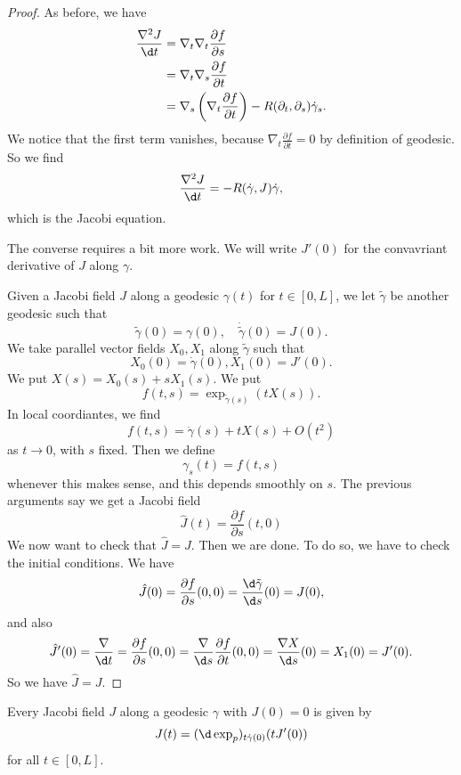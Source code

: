 \documentclass[a4paper]{article}
\begin{document}
\begin{proof}
  As before, we have
  \begin{align*}
    \frac{\nabla^2 J}{\d t} &= \nabla_t \nabla_t \frac{\partial f}{\partial s}\\
    &= \nabla_t \nabla_s \frac{\partial f}{\partial t}\\
    &= \nabla_s \left(\nabla_t \frac{\partial f}{\partial t}\right) - R(\partial_t, \partial_s) \dot{\gamma}_s.
  \end{align*}
  We notice that the first term vanishes, because $\nabla_t \frac{\partial f}{\partial t} = 0$ by definition of geodesic. So we find
  \[
    \frac{\nabla^2 J}{\d t} = -R(\dot{\gamma}, J) \dot{\gamma},
  \]
  which is the Jacobi equation.

  The converse requires a bit more work. We will write $J'(0)$ for the convavriant derivative of $J$ along $\gamma$.

  Given a Jacobi field $J$ along a geodesic $\gamma(t)$ for $t \in [0, L]$, we let $\tilde{\gamma}$ be another geodesic such that
  \[
    \tilde{\gamma}(0) = \gamma(0),\quad \dot{\tilde{\gamma}}(0) = J(0).
  \]
  We take parallel vector fields $X_0, X_1$ along $\tilde{\gamma}$ such that
  \[
    X_0(0) = \dot{\gamma}(0), X_1(0) = J'(0).
  \]
  We put $X(s) = X_0(s) + s X_1(s)$. We put
  \[
    f(t, s) = \exp_{\tilde{\gamma}(s)} (t X(s)).
  \]
  In local coordiantes, we find
  \[
    f(t, s) = \dot{\gamma}(s) + t X(s) + O(t^2)
  \]
  as $t \to 0$, with $s$ fixed. Then we define
  \[
    \gamma_s(t) = f(t, s)
  \]
  whenever this makes sense, and this depends smoothly on $s$. The previous arguments say we get a Jacobi field
  \[
    \hat{J}(t) = \frac{\partial f}{\partial s}(t, 0)
  \]
  We now want to check that $\hat{J} = J$. Then we are done. To do so, we have to check the initial conditions. We have
  \[
    \hat{J}(0) = \frac{\partial f}{\partial s}(0, 0) = \frac{\d \tilde{\gamma}}{\d s}(0) = J(0),
  \]
  and also
  \[
    \hat{J}'(0) = \frac{\nabla}{\d t} = \frac{\partial f}{\partial s}(0, 0) = \frac{\nabla}{\d s} \frac{\partial f}{\partial t}(0, 0) = \frac{\nabla X}{\d s}(0) = X_1(0) = J'(0).
  \]
  So we have $\hat{J} = J$.
\end{proof}

\begin{cor}
  Every Jacobi field $J$ along a geodesic $\gamma$ with $J(0) = 0$ is given by
  \[
    J(t) = (\d \exp_p)_{t \dot{\gamma}(0)} (t J'(0))
  \]
  for all $t \in [0, L]$.
\end{cor}
\end{document}

